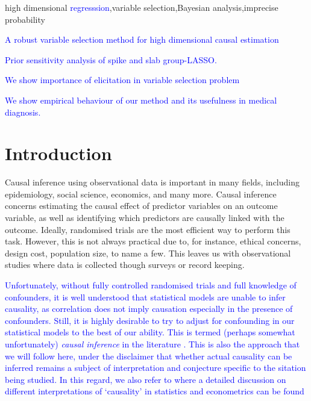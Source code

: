 \documentclass[preprint,12pt]{elsarticle}
\newcommand{\added}[1]{\textcolor{blue}{#1}}
\begin{document}
\begin{frontmatter}
\begin{keyword}
  high dimensional \added{regresssion}\sep variable selection\sep Bayesian analysis\sep imprecise probability
\end{keyword}

\begin{highlights}
\item \added{A robust variable selection method for high dimensional causal estimation} 

\item \added{Prior sensitivity analysis of spike and slab group-LASSO.} 

\item \added{We show importance of elicitation in variable
selection problem}

\item \added{We show empirical behaviour of our method and
its usefulness in medical diagnosis.}

\end{highlights}

\end{frontmatter}
\section{Introduction}\label{sec:intro}

Causal inference using observational data is important in
many fields, including epidemiology, social science, economics, and many more.
Causal inference concerns estimating the causal
effect of predictor variables on an outcome variable,
as well as identifying which predictors are causally linked with the outcome.
Ideally,
randomised trials are the most efficient way to perform this task.
However, this is not always practical due to, for instance, ethical 
concerns, design cost, population size, to name a few. This
leaves us with observational studies
where data is collected though surveys or record keeping.

\added{%
Unfortunately, without fully controlled randomised trials and full
knowledge of confounders, it is well understood that
statistical models are unable to infer causality, as correlation
does not imply causation especially in the presence of confounders.
Still, it is highly desirable to try to adjust for confounding in
our statistical models to the best of our ability. This is termed
(perhaps somewhat unfortunately) \emph{causal inference} in the
literature
\citep{rubin1978,rosenbaum83,Robins1986ANA,winship99,stuart10,Zigler2014,wang2015,koch2018,Hahn2018,koch2020}. 
This is also the approach that we will follow here, under the
disclaimer that whether actual causality can be inferred
remains a subject of interpretation and conjecture specific to the
sitation being studied. In this regard, we also refer to \citep{imbiens_2022}
where a detailed discussion on different interpretations of `causality'
in statistics and econometrics can be found 
}
\end{document}
